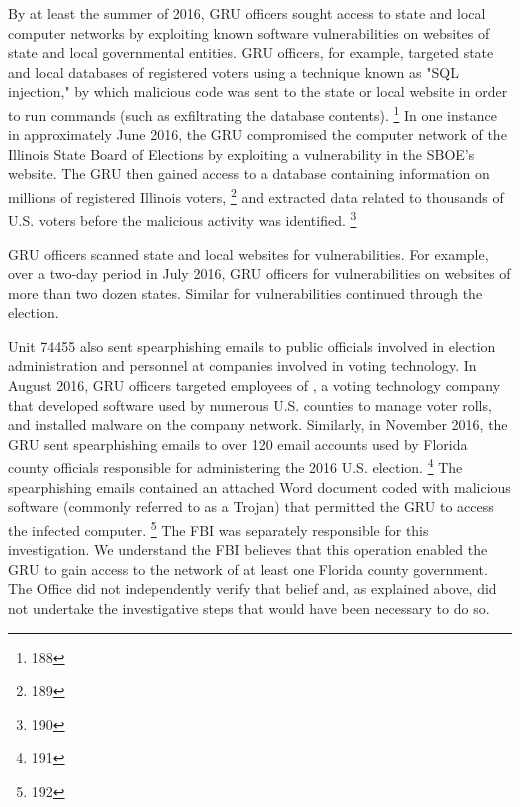 By at least the summer of 2016, GRU officers sought access to state and local computer networks by exploiting known software vulnerabilities on websites of state and local governmental entities.
GRU officers, for example, targeted state and local databases of registered voters using a technique known as "SQL injection," by which malicious code was sent to the state or local website in order to run commands (such as exfiltrating the database contents).%
\footnote{188}
In one instance in approximately June 2016, the GRU compromised the computer network of the Illinois State Board of Elections by exploiting a vulnerability in the SBOE's website.
The GRU then gained access to a database containing information on millions of registered Illinois voters,%
\footnote{189}
and extracted data related to thousands of U.S. voters before the malicious activity was identified.%
\footnote{190}

GRU officers  scanned state and local websites for vulnerabilities.
For example, over a two-day period in July 2016, GRU officers  for vulnerabilities on websites of more than two dozen states.
Similar  for vulnerabilities continued through the election.

Unit 74455 also sent spearphishing emails to public officials involved in election administration and personnel at companies involved in voting technology.
In August 2016, GRU officers targeted employees of , a voting technology company that developed software used by numerous U.S. counties to manage voter rolls, and installed malware on the company network.
Similarly, in November 2016, the GRU sent spearphishing emails to over 120 email accounts used by Florida county officials responsible for administering the 2016 U.S. election.%
\footnote{191}
The spearphishing emails contained an attached Word document coded with malicious software (commonly referred to as a Trojan) that permitted the GRU to access the infected computer.%
\footnote{192}
The FBI was separately responsible for this investigation.
We understand the FBI believes that this operation enabled the GRU to gain access to the network of at least one Florida county government.
The Office did not independently verify that belief and, as explained above, did not undertake the investigative steps that would have been necessary to do so.


